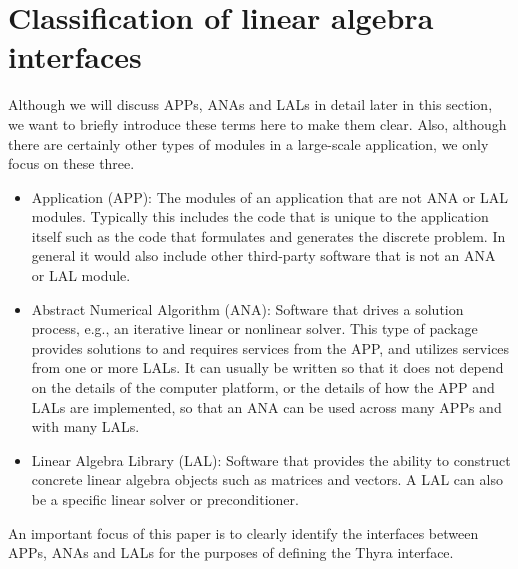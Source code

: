 \documentclass[pdf,ps2pdf,11pt]{SANDreport}
\begin{document}
%
\section{Classification of linear algebra interfaces}
\label{tsfcore:sec:classification_of_lin_alg_itfc}
%

Although we will discuss APPs, ANAs and LALs in detail later in this
section, we want to briefly introduce these terms here to make them
clear.  Also, although there are certainly other types of modules in a
large-scale application, we only focus on these three.
\begin{itemize}
\item Application (APP):  The modules of an application that are not
ANA or LAL modules.  Typically this includes the code that is unique
to the application itself such as the code that formulates and
generates the discrete problem.  In general it would also include
other third-party software that is not an ANA or LAL module.
\item Abstract Numerical Algorithm (ANA):  Software that drives a 
solution process, e.g., an iterative linear or nonlinear solver.  This
type of package provides solutions to and requires services from the
APP, and utilizes services from one or more LALs.  It can usually be
written so that it does not depend on the details of the computer
platform, or the details of how the APP and LALs are implemented, so
that an ANA can be used across many APPs and with many LALs.
\item Linear Algebra Library (LAL): Software that provides the 
ability to construct
concrete linear algebra objects such as matrices and vectors.  
A LAL can also be a specific linear solver or preconditioner.
\end{itemize}

An important focus of this paper is to clearly identify the interfaces
between APPs, ANAs and LALs for the purposes of defining the Thyra
interface.
\end{document}
